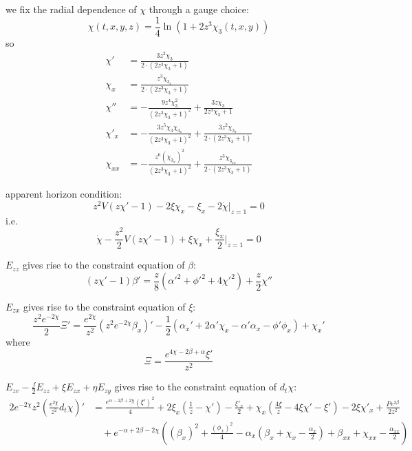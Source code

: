 \documentclass[12pt,a4paper]{article}
\numberwithin{equation}{section}
\begin{document}
we fix the radial dependence of $\chi$ through a gauge choice:
\begin{equation}
    \chi\left(t,x,y,z\right)=\frac{1}{4}\ln(1+2z^{3}\chi_{3}(t,x,y))
\end{equation}
so
\begin{align}
    \chi'&=\frac{3 z^{2} \chi_{3}}{2 \cdot \left(2 z^{3} \chi_{3} + 1\right)}\\
    \chi_x&=\frac{z^{3} \chi_{3_x}}{2 \cdot \left(2 z^{3} \chi_{3} + 1\right)}\\
    \chi''&=- \frac{9 z^{4} \chi_{3}^{2}}{\left(2 z^{3} \chi_{3} + 1\right)^2} + \frac{3 z \chi_{3}}{2 z^{3} \chi_{3} + 1}\\
    \chi'_x&=- \frac{3 z^{5} \chi_{3} \chi_{3_x}}{\left(2 z^{3} \chi_{3} + 1\right)^2} + \frac{3 z^{2} \chi_{3_x}}{2 \cdot \left(2 z^{3} \chi_{3} + 1\right)}\\
    \chi_{xx}&=- \frac{z^{6} \left(\chi_{3_x}\right)^{2}}{\left(2 z^{3} \chi_{3} + 1\right)^2} + \frac{z^{3} \chi_{3_{xx}}}{2 \cdot \left(2 z^{3} \chi_{3} + 1\right)}
\end{align}

apparent horizon condition:
\begin{equation}
    z^2V(z\chi'-1)-2\xi\chi_x-\xi_x-2\dot{\chi}|_{z=1}=0
\end{equation}
i.e.
\begin{equation}
    \dot{\chi}-\frac{z^2}{2}V(z\chi'-1)+\xi\chi_x+\frac{\xi_x}{2}|_{z=1}=0
\end{equation}

$E_{zz}$ gives rise to the constraint equation of $\beta$:
\begin{equation}
    (z\chi'-1)\beta'=\frac{z}{8}(\alpha'^2+\phi'^2+4\chi'^2)+\frac{z}{2}\chi''
\end{equation}

$E_{zx}$ gives rise to the constraint equation of $\xi$:
\begin{equation}
    \frac{z^2e^{-2\chi}}{2}\Xi'=\frac{e^{2\chi}}{z^2}(z^2e^{-2\chi}\beta_x)'-\frac{1}{2}(\alpha_x'+2\alpha'\chi_x-\alpha'\alpha_x-\phi'\phi_x)+\chi_x'
\end{equation}
where
\begin{equation}
    \Xi=\frac{e^{4\chi-2\beta+\alpha}\xi'}{z^2}
\end{equation}

$E_{zv}-\frac{f}{2}E_{zz}+\xi E_{zx}+\eta E_{zy}$ gives rise to the constraint equation of $d_t\chi$:
\begin{equation}
    \begin{aligned}
        2e^{-2\chi}z^2 \left(\frac{e^{2\chi}}{z^2}d_t\chi\right)' &= \frac{e^{\alpha- 2 \beta+2 \chi} \left(\xi'\right)^{2}}{4}+2 \xi_x \left(\frac{1}{z} - \chi'\right) - \frac{\xi'_x}{2} + \chi_x \left(\frac{4 \xi}{z} - 4 \xi \chi' - \xi'\right) - 2 \xi \chi'_x + \frac{P e^{2 \beta}}{2 z^{2}}\\
        &\quad + e^{- \alpha+2 \beta- 2 \chi} \left(\left(\beta_x\right)^{2} + \frac{\left(\phi_x\right)^{2}}{4} - \alpha_x \left(\beta_x + \chi_x - \frac{\alpha_x}{2}\right) + \beta_{xx} + \chi_{xx} - \frac{\alpha_{xx}}{2}\right)
    \end{aligned}
\end{equation}
\end{document}
